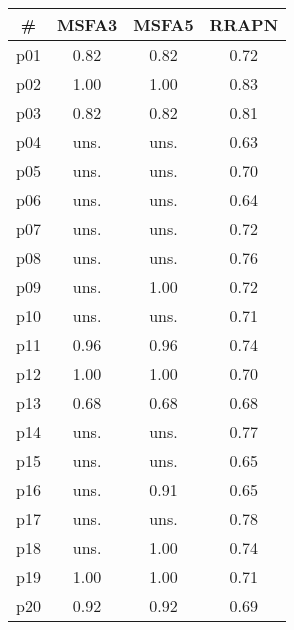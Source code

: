 \begin{tabular}{cccc}
\toprule
\textbf{\#} & \textbf{MSFA3} & \textbf{MSFA5} & \textbf{RRAPN}\\
\midrule
p01 & 0.82 & 0.82 & 0.72\\
p02 & 1.00 & 1.00 & 0.83\\
p03 & 0.82 & 0.82 & 0.81\\
p04 & uns. & uns. & 0.63\\
p05 & uns. & uns. & 0.70\\
p06 & uns. & uns. & 0.64\\
p07 & uns. & uns. & 0.72\\
p08 & uns. & uns. & 0.76\\
p09 & uns. & 1.00 & 0.72\\
p10 & uns. & uns. & 0.71\\
p11 & 0.96 & 0.96 & 0.74\\
p12 & 1.00 & 1.00 & 0.70\\
p13 & 0.68 & 0.68 & 0.68\\
p14 & uns. & uns. & 0.77\\
p15 & uns. & uns. & 0.65\\
p16 & uns. & 0.91 & 0.65\\
p17 & uns. & uns. & 0.78\\
p18 & uns. & 1.00 & 0.74\\
p19 & 1.00 & 1.00 & 0.71\\
p20 & 0.92 & 0.92 & 0.69\\
\bottomrule
\end{tabular}

